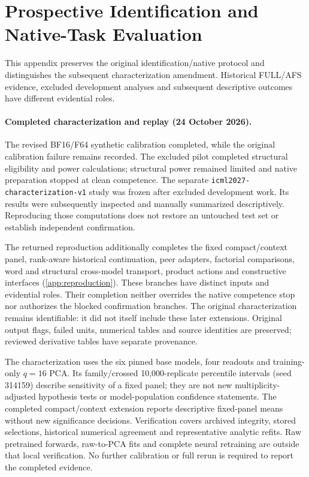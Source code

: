 \section{Prospective Identification and Native-Task Evaluation}
\label{app:prospective}
This appendix preserves the original identification/native protocol and distinguishes the subsequent characterization amendment. Historical FULL/AFS evidence, excluded development analyses and subsequent descriptive outcomes have different evidential roles.

\paragraph{Completed characterization and replay (24 October 2026).}
The revised BF16/F64 synthetic calibration completed, while the original calibration failure remains recorded. The excluded pilot completed structural eligibility and power calculations; structural power remained limited and native preparation stopped at clean competence. The separate \texttt{icml2027-characterization-v1} study was frozen after excluded development work. Its results were subsequently inspected and manually summarized descriptively. Reproducing those computations does not restore an untouched test set or establish independent confirmation.

The returned reproduction additionally completes the fixed compact/context panel, rank-aware historical continuation, peer adapters, factorial comparisons, word and structural cross-model transport, product actions and constructive interfaces (\cref{app:reproduction}). These branches have distinct inputs and evidential roles. Their completion neither overrides the native competence stop nor authorizes the blocked confirmation branches. The original characterization remains identifiable: it did not itself include these later extensions. Original output flags, failed units, numerical tables and source identities are preserved; reviewed derivative tables have separate provenance.

The characterization uses the six pinned base models, four readouts and training-only $q=16$ PCA. Its family/crossed 10,000-replicate percentile intervals (seed 314159) describe sensitivity of a fixed panel; they are not new multiplicity-adjusted hypothesis tests or model-population confidence statements. The completed compact/context extension reports descriptive fixed-panel means without new significance decisions. Verification covers archived integrity, stored selections, historical numerical agreement and representative analytic refits. Raw pretrained forwards, raw-to-PCA fits and complete neural retraining are outside that local verification. No further calibration or full rerun is required to report the completed evidence.

